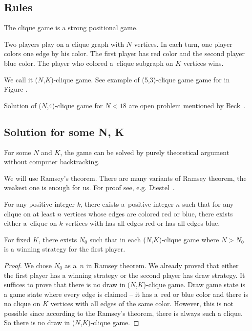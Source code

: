 \subsection{Rules}

The clique game is a strong positional game. 

Two players play on a clique graph with
$N$ vertices. In each turn, one player colors one edge by his color. The first
player has red color and the second player blue color. The player who colored
a~clique subgraph on $K$ vertices wins. 

We call it ($N$,$K$)-clique game.
See example of (5,3)-clique game game for in Figure .

Solution of ($N$,4)-clique game for $N < 18$ are open problem mentioned
by Beck~\cite{beck}.

\subsection{Solution for some N, K}

For some $N$ and $K$, the game can be solved by purely theoretical argument
without computer backtracking.

We will use Ramsey's theorem. There are many variants of Ramsey theorem, the weakest
one is enough for us. For proof see, e.g. Diestel~\cite{ramsey}. 

\begin{theorem} 
	
For any positive integer $k$, there exists a~positive integer $n$ such that for
any clique on at least $n$ vertices whose edges are colored red or blue, there
exists either a~clique on $k$ vertices with has all edges red or has all edges
blue.

\end{theorem}

\begin{theorem} \label{solution} 
	
For fixed $K$, there exists $N_0$ such that in each ($N$,$K$)-clique game where
$N > N_0$ is a winning strategy for the first player.  

\end{theorem}

\begin{proof} 
	
We chose $N_0$ as a~$n$ in Ramsey theorem. We already proved that either the
first player has a winning strategy or the second player has draw strategy. It
suffices to prove that there is no draw in ($N$,$K$)-clique game. Draw game
state is a game state where every edge is claimed -- it has a~red or blue color
and there is no clique on $K$ vertices with all edges of the same color.
However, this is not possible since according to the Ramsey's theorem, there is
always such a clique. So there is no draw in ($N$,$K$)-clique game.

\end{proof}

